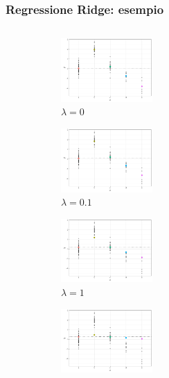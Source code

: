 \documentclass[pdf, aspectratio=169]{beamer}\usepackage[]{graphicx}\usepackage[]{color}
\theoremstyle{definition}
\begin{document}
\begin{frame}
\frametitle{Regressione Ridge: esempio}

\fontsize{9pt}{11pt}\selectfont

\begin{columns}[c]
\begin{column}{0.55\linewidth}
  \begin{figure}
    \centering
    \begin{subfigure}[b]{3cm}
      \centering
      \includegraphics[width=3.5cm]{_bookdown_files/_main_files/figure-latex/ridge-lambda-1.pdf}
      \caption{$\lambda = 0$}
    \end{subfigure}
    \qquad
    \begin{subfigure}[b]{3cm}
      \centering
      \includegraphics[width=3.5cm]{_bookdown_files/_main_files/figure-latex/ridge-lambda-2.pdf}
      \caption{$\lambda = 0.1$}
    \end{subfigure}
    \par\medskip
    \begin{subfigure}[b]{3cm}
      \centering
      \includegraphics[width=3.5cm]{_bookdown_files/_main_files/figure-latex/ridge-lambda-3.pdf}
      \caption{$\lambda = 1$}
    \end{subfigure}
    \qquad
    \begin{subfigure}[b]{3cm}
      \centering
      \includegraphics[width=3.5cm]{_bookdown_files/_main_files/figure-latex/ridge-lambda-4.pdf}

\end{subfigure}
\end{figure}
\end{column}
\end{columns}
\end{frame}
\end{document}
